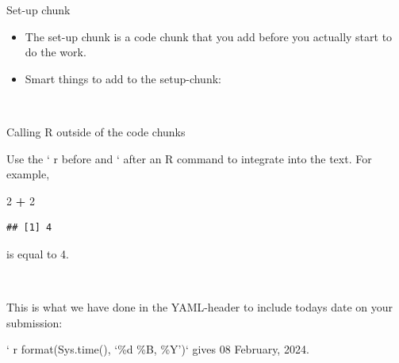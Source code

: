 \documentclass[
  10pt,
  ignorenonframetext,
]{beamer}
\newenvironment{Shaded}{\begin{snugshade}}{\end{snugshade}}
\newcommand{\AttributeTok}[1]{\textcolor[rgb]{0.13,0.29,0.53}{#1}}
\newcommand{\ConstantTok}[1]{\textcolor[rgb]{0.56,0.35,0.01}{#1}}
\newcommand{\DecValTok}[1]{\textcolor[rgb]{0.00,0.00,0.81}{#1}}
\newcommand{\FunctionTok}[1]{\textcolor[rgb]{0.13,0.29,0.53}{\textbf{#1}}}
\newcommand{\NormalTok}[1]{#1}
\newcommand{\SpecialCharTok}[1]{\textcolor[rgb]{0.81,0.36,0.00}{\textbf{#1}}}
\newcommand{\StringTok}[1]{\textcolor[rgb]{0.31,0.60,0.02}{#1}}
\providecommand{\tightlist}{%
  \setlength{\itemsep}{0pt}\setlength{\parskip}{0pt}}
\begin{document}
\begin{frame}[fragile]
\begin{block}{Set-up chunk}
\protect\hypertarget{set-up-chunk}{}
\(~\)

\begin{itemize}
\tightlist
\item
  The set-up chunk is a code chunk that you add before you actually
  start to do the work.
\end{itemize}

\vspace{2mm}

\begin{itemize}
\tightlist
\item
  Smart things to add to the setup-chunk:
\end{itemize}

\(~\)

\scriptsize

\begin{Shaded}
\end{Shaded}
\end{block}
\end{frame}

\begin{frame}[fragile]
\begin{block}{Calling R outside of the code chunks}
\protect\hypertarget{calling-r-outside-of-the-code-chunks}{}
\(~\)

Use the ` r before and ` after an R command to integrate into the text.
For example,

\begin{Shaded}
\begin{Highlighting}[]
\DecValTok{2} \SpecialCharTok{+} \DecValTok{2}
\end{Highlighting}
\end{Shaded}

\begin{verbatim}
## [1] 4
\end{verbatim}

is equal to 4.

\(~\)

This is what we have done in the YAML-header to include todays date on
your submission:

` r format(Sys.time(), `\%d \%B, \%Y')` gives 08 February, 2024.
\end{block}
\end{frame}
\end{document}
